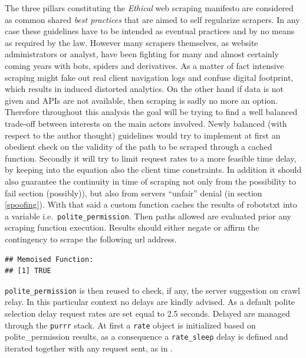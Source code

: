 \documentclass[
  12pt,
  a4paper,
  oneside]{book}
\theoremstyle{definition}
\theoremstyle{definition}
\theoremstyle{definition}
\theoremstyle{remark}
\begin{document}
The three pillars constituting the \emph{Ethical} web scraping manifesto \citep{densmore_2019} are considered as common shared \emph{best practices} that are aimed to self regularize scrapers. In any case these guidelines have to be intended as eventual practices and by no means as required by the law. However many scrapers themselves, as website administrators or analyst, have been fighting for many and almost certainly coming years with bots, spiders and derivatives. As a matter of fact intensive scraping might fake out real client navigation logs and confuse digital footprint, which results in induced distorted analytics. On the other hand if data is not given and APIs are not available, then scraping is sadly no more an option.
Therefore throughout this analysis the goal will be trying to find a well balanced trade-off between interests on the main actors involved.
Newly balanced (with respect to the author thought) guidelines would try to implement at first an obedient check on the validity of the path to be scraped through a cached function. Secondly it will try to limit request rates to a more feasible time delay, by keeping into the equation also the client time constraints. In addition it should also guarantee the continuity in time of scraping not only from the possibility to fail section (possibly)), but also from servers ``unfair'' denial (in section \ref{spoofing}).
With that said a custom function caches the results of robotstxt into a variable i.e.~\texttt{polite\_permission}. Then paths allowed are evaluated prior any scraping function execution. Results should either negate or affirm the contingency to scrape the following url address.

\begin{verbatim}
## Memoised Function:
## [1] TRUE
\end{verbatim}

\texttt{polite\_permission} is then reused to check, if any, the server suggestion on crawl relay. In this particular context no delays are kindly advised. As a default polite selection delay request rates are set equal to 2.5 seconds. Delayed are managed through the \texttt{purrr} stack. At first a \texttt{rate} object is initialized based on polite\_permission results, as a consequence a \texttt{rate\_sleep} delay is defined and iterated together with any request sent, as in \citet{rate_delay}.
\end{document}

